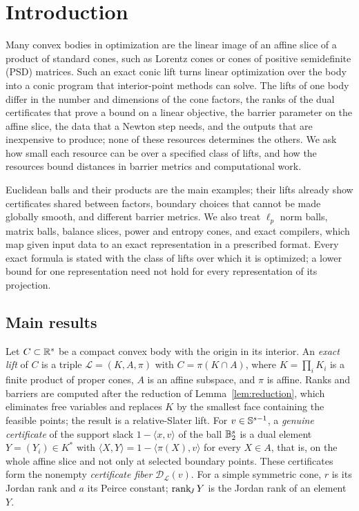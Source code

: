 \section{Introduction}\label{sec:introduction}
Many convex bodies in optimization are the linear image of an affine
slice of a product of standard cones, such as Lorentz cones or cones of
positive semidefinite (PSD) matrices. Such an exact conic lift turns
linear optimization over the body into a conic program that
interior-point methods can solve. The lifts of one body differ in the
number and dimensions of the cone factors, the ranks of the dual
certificates that prove a bound on a linear objective, the barrier
parameter on the affine slice, the data that a Newton step needs, and
the outputs that are inexpensive to produce; none of these resources
determines the others. We ask how small each resource can be over a
specified class of lifts, and how the resources bound distances in
barrier metrics and computational work.

Euclidean balls and their products are the main examples; their lifts
already show certificates shared between factors, boundary choices that
cannot be made globally smooth, and different barrier metrics. We also
treat $\ell_p$ norm balls, matrix balls, balance slices, power and
entropy cones, and exact compilers, which map given input data to an
exact representation in a prescribed format. Every exact formula is stated with the
class of lifts over which it is optimized; a lower bound for one
representation need not hold for every representation of its projection.

\subsection{Main results}
Let $C\subset\mathbb R^s$ be a compact convex body with the origin in its
interior. An \emph{exact lift} of $C$ is a triple $\mathcal L=(K,A,\pi)$
with $C=\pi(K\cap A)$, where $K=\prod_iK_i$ is a finite product of
proper cones, $A$ is an affine subspace, and $\pi$ is affine. Ranks and
barriers are computed after the reduction of Lemma~\ref{lem:reduction},
which eliminates free variables and replaces $K$ by the smallest face
containing the feasible points; the result is a relative-Slater lift.
For $v\in\mathbb S^{s-1}$, a \emph{genuine certificate} of the support slack
$1-\langle x,v\rangle$ of the ball $\mathbb B_2^s$ is a dual element
$Y=(Y_i)\in K^*$ with $\langle X,Y\rangle=1-\langle\pi(X),v\rangle$ for
every $X\in A$, that is, on the whole affine slice and not only at
selected boundary points. These certificates form the nonempty
\emph{certificate fiber} $\mathcal D_{\mathcal L}(v)$. For a simple
symmetric cone, $r$ is its Jordan rank and $a$ its Peirce constant;
$\operatorname{rank}_{\!J} Y$ is the Jordan rank of an element $Y$.

